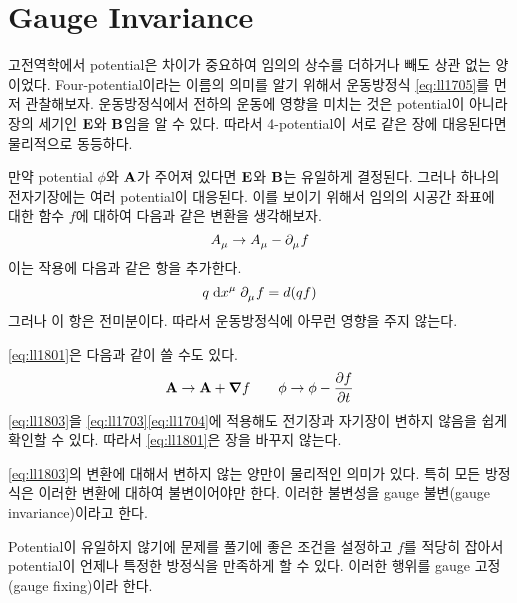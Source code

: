 \section{Gauge Invariance}
\label{sec:05a-04a}

고전역학에서 potential은 차이가 중요하여 임의의 상수를 더하거나 빼도 상관 없는 양이었다. Four-potential이라는 이름의 의미를 알기 위해서 운동방정식 \eqref{eq:ll1705}를 먼저 관찰해보자. 운동방정식에서 전하의 운동에 영향을 미치는 것은 potential이 아니라 장의 세기인 $\vb{E}$와 $\vb{B}$임을 알 수 있다. 따라서 4-potential이 서로 같은 장에 대응된다면 물리적으로 동등하다.

만약 potential $\phi$와 $\vb{A}$가 주어져 있다면 $\vb{E}$와 $\vb{B}$는 유일하게 결정된다. 그러나 하나의 전자기장에는 여러 potential이 대응된다. 이를 보이기 위해서 임의의 시공간 좌표에 대한 함수 $f$에 대하여 다음과 같은 변환을 생각해보자.
\begin{equation}\label{eq:ll1801}
    \tensor{A}{_\mu} \to \tensor{A}{_\mu} - \tensor{\partial}{_\mu} f
\end{equation}
이는 작용에 다음과 같은 항을 추가한다.
\begin{equation}
    q \; \dd \tensor{x}{^\mu} \; \tensor{\partial}{_\mu} f = d ( q f )
\end{equation}
그러나 이 항은 전미분이다. 따라서 운동방정식에 아무런 영향을 주지 않는다.

\eqref{eq:ll1801}은 다음과 같이 쓸 수도 있다.
\begin{equation}\label{eq:ll1803}
    \vb{A} \to \vb{A} + \grad f \qquad \phi \to \phi - \pdv{f}{t}
\end{equation}
\eqref{eq:ll1803}을 \eqref{eq:ll1703}\과 \eqref{eq:ll1704}에 적용해도 전기장과 자기장이 변하지 않음을 쉽게 확인할 수 있다. 따라서 \eqref{eq:ll1801}은 장을 바꾸지 않는다.

\eqref{eq:ll1803}의 변환에 대해서 변하지 않는 양만이 물리적인 의미가 있다. 특히 모든 방정식은 이러한 변환에 대하여 불변이어야만 한다. 이러한 불변성을 gauge 불변(gauge invariance)이라고 한다.

Potential이 유일하지 않기에 문제를 풀기에 좋은 조건을 설정하고 $f$를 적당히 잡아서 potential이 언제나 특정한 방정식을 만족하게 할 수 있다. 이러한 행위를 gauge 고정(gauge fixing)이라 한다.
